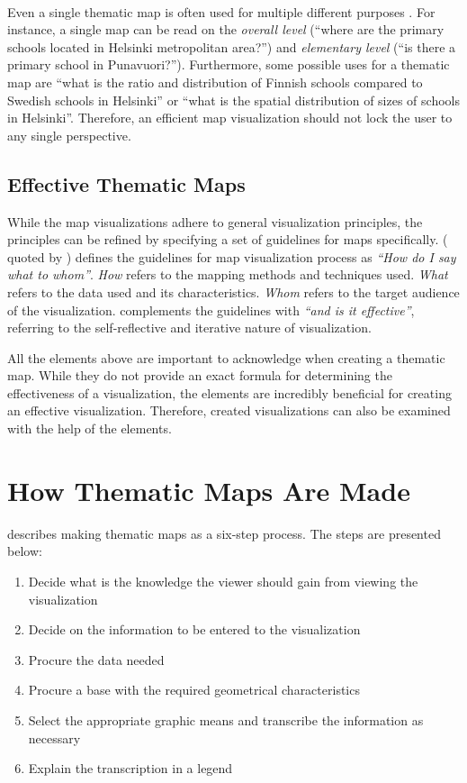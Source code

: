 ~

Even a single thematic map is often used for multiple different purposes \citep[chap.~2]{schlichtmann_visualization_2002}. For instance, a single map can be read on the \emph{overall level} (``where are the primary schools located in Helsinki metropolitan area?'') and \emph{elementary level} (``is there a primary school in Punavuori?''). Furthermore, some possible uses for a thematic map are ``what is the ratio and distribution of Finnish schools compared to Swedish schools in Helsinki'' or ``what is the spatial distribution of sizes of schools in Helsinki''. Therefore, an efficient map visualization should not lock the user to any single perspective.

\subsection{Effective Thematic Maps}
\label{subsection:effectivemaps}

While the map visualizations adhere to general visualization principles, the principles can be refined by specifying a set of guidelines for maps specifically. \citeauthor{koeman_het_1969} (\citeyear{koeman_het_1969} quoted by \citealt[p.~12]{kraak_cartographic_1998}) defines the guidelines for map visualization process as \emph{``How do I say what to whom''}. \emph{How} refers to the mapping methods and techniques used. \emph{What} refers to the data used and its characteristics. \emph{Whom} refers to the target audience of the visualization. \citet{kraak_cartographic_1998} complements the guidelines with \emph{``and is it effective''}, referring to the self-reflective and iterative nature of visualization.

All the elements above are important to acknowledge when creating a thematic map. While they do not provide an exact formula for determining the effectiveness of a visualization, the elements are incredibly beneficial for creating an effective visualization. Therefore, created visualizations can also be examined with the help of the elements.

\section{How Thematic Maps Are Made}
\label{section:thematicmaps}
\citet{schlichtmann_visualization_2002} describes making thematic maps as a six-step process. The steps are presented below:
\begin{enumerate}
	\item Decide what is the knowledge the viewer should gain from viewing the visualization
	\item Decide on the information to be entered to the visualization
	\item Procure the data needed
	\item Procure a base with the required geometrical characteristics
	\item Select the appropriate graphic means and transcribe the information as necessary
	\item Explain the transcription in a legend
\end{enumerate}

